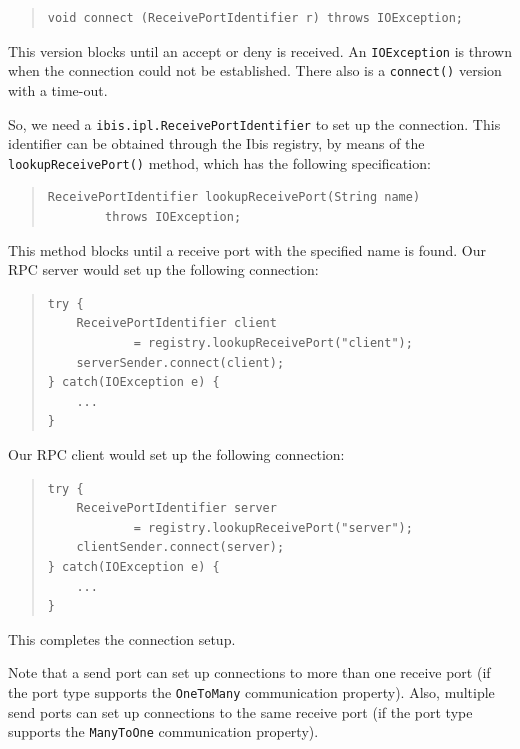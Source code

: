 \documentclass[10pt]{article}
\begin{document}
{\small
\begin{quote}
\begin{verbatim}
void connect (ReceivePortIdentifier r) throws IOException;
\end{verbatim}
\end{quote}
}

\noindent
This version blocks until an accept or deny is received.
An \texttt{IOException} is thrown when the connection could not be established.
There also is a \texttt{connect()} version with a time-out.

So, we need a \texttt{ibis.ipl.ReceivePortIdentifier} to set up the
connection.
This identifier can be obtained through the Ibis registry, by
means of the \texttt{lookupReceivePort()} method, which has the following specification:

{\small
\begin{quote}
\begin{verbatim}
ReceivePortIdentifier lookupReceivePort(String name)
        throws IOException;
\end{verbatim}
\end{quote}
}
\noindent
This method blocks until a receive port with the specified name is found.
Our RPC server would set up the following connection:

{\small
\begin{quote}
\begin{verbatim}
try {
    ReceivePortIdentifier client
            = registry.lookupReceivePort("client");
    serverSender.connect(client);
} catch(IOException e) {
    ...
}
\end{verbatim}
\end{quote}
}

\noindent
Our RPC client would set up the following connection:

{\small
\begin{quote}
\begin{verbatim}
try {
    ReceivePortIdentifier server
            = registry.lookupReceivePort("server");
    clientSender.connect(server);
} catch(IOException e) {
    ...
}
\end{verbatim}
\end{quote}
}

This completes the connection setup.

Note that a send port can set up connections to more than one
receive port (if the port type supports the \texttt{OneToMany}
communication property). Also, multiple send ports can set up
connections to the same receive port (if the port type supports
the \texttt{ManyToOne} communication property).
\end{document}
